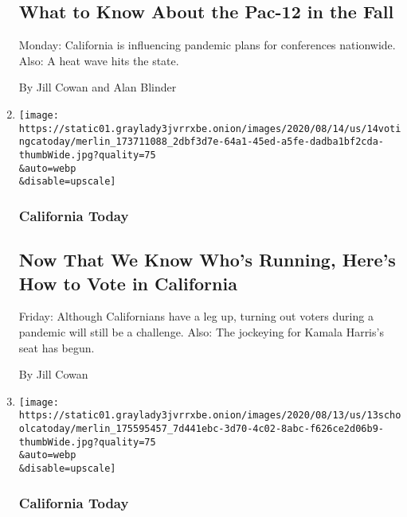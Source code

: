 \begin{enumerate}
  \hypertarget{what-to-know-about-the-pac-12-in-the-fall}{%
  \subsection{What to Know About the Pac-12 in the
  Fall}\label{what-to-know-about-the-pac-12-in-the-fall}}

  Monday: California is influencing pandemic plans for conferences
  nationwide. Also: A heat wave hits the state.

  By Jill Cowan and Alan Blinder
\item
  \href{/2020/08/14/us/ca-voter-status-mail-ballot.html}{}

  \texttt{[image: https://static01.graylady3jvrrxbe.onion/images/2020/08/14/us/14votingcatoday/merlin\_173711088\_2dbf3d7e-64a1-45ed-a5fe-dadba1bf2cda-thumbWide.jpg?quality=75\\\&auto=webp\\\&disable=upscale]}

  \hypertarget{california-today-3}{%
  \subsubsection{California Today}\label{california-today-3}}

  \hypertarget{now-that-we-know-whos-running-heres-how-to-vote-in-california}{%
  \subsection{Now That We Know Who's Running, Here's How to Vote in
  California}\label{now-that-we-know-whos-running-heres-how-to-vote-in-california}}

  Friday: Although Californians have a leg up, turning out voters during
  a pandemic will still be a challenge. Also: The jockeying for Kamala
  Harris's seat has begun.

  By Jill Cowan
\item
  \href{/2020/08/13/us/ca-school-district-reopening-guidelines.html}{}

  \texttt{[image: https://static01.graylady3jvrrxbe.onion/images/2020/08/13/us/13schoolcatoday/merlin\_175595457\_7d441ebc-3d70-4c02-8abc-f626ce2d06b9-thumbWide.jpg?quality=75\\\&auto=webp\\\&disable=upscale]}

  \hypertarget{california-today-4}{%
  \subsubsection{California Today}\label{california-today-4}}


\end{enumerate}
